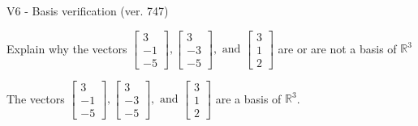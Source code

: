 \begin{exercise}
  \begin{exerciseTitle}V6 - Basis verification (ver. 747)\end{exerciseTitle}
  \begin{exerciseStatement}
    Explain why the vectors \(\left[\begin{array}{r}
3 \\
-1 \\
-5
\end{array}\right] , \left[\begin{array}{r}
3 \\
-3 \\
-5
\end{array}\right] , \text{ and } \left[\begin{array}{r}
3 \\
1 \\
2
\end{array}\right]\) are or are not a basis of \(\mathbb{R}^3\)	


  \end{exerciseStatement}
  \begin{exerciseAnswer}
   The vectors \(\left[\begin{array}{r}
3 \\
-1 \\
-5
\end{array}\right] , \left[\begin{array}{r}
3 \\
-3 \\
-5
\end{array}\right] , \text{ and } \left[\begin{array}{r}
3 \\
1 \\
2
\end{array}\right]\) 
  	 are  a basis of \(\mathbb{R}^3\).
  


  \end{exerciseAnswer}
\end{exercise}